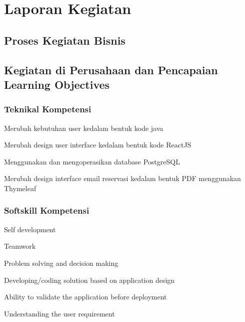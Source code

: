 \documentclass{monthlyReport}
\begin{document}
\section{Laporan Kegiatan}
\subsection{Proses Kegiatan Bisnis}
    
\subsection{Kegiatan di Perusahaan dan Pencapaian Learning Objectives}
    \subsubsection{Teknikal Kompetensi}
        \begin{modlist}
            \item Merubah kebutuhan user kedalam bentuk kode java
            \item Merubah design user interface kedalam bentuk kode ReactJS
            \item Menggunakan dan mengoperasikan database PostgreSQL
            \item Merubah design interface email reservasi kedalam bentuk PDF menggunakan Thymeleaf
        \end{modlist}
        
    \subsubsection{Softskill Kompetensi}
        \begin{modlist}
            \item Self development
            \item Teamwork
            \item Problem solving and decision making
            \item Developing/coding solution based on application design
            \item Ability to validate the application before deployment 
            \item Understanding the user requirement
        \end{modlist}
        
\end{document}
